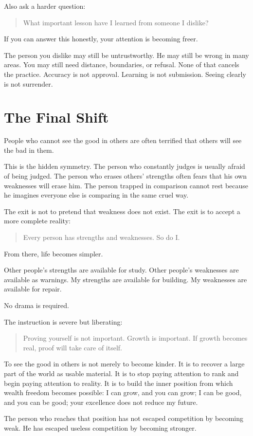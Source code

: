 Also ask a harder question:

\begin{quote}
What important lesson have I learned from someone I dislike?
\end{quote}

If you can answer this honestly, your attention is becoming freer.

The person you dislike may still be untrustworthy. He may still be wrong in many areas. You may still need distance, boundaries, or refusal. None of that cancels the practice. Accuracy is not approval. Learning is not submission. Seeing clearly is not surrender.

\section*{The Final Shift}

People who cannot see the good in others are often terrified that others will see the bad in them.

This is the hidden symmetry. The person who constantly judges is usually afraid of being judged. The person who erases others' strengths often fears that his own weaknesses will erase him. The person trapped in comparison cannot rest because he imagines everyone else is comparing in the same cruel way.

The exit is not to pretend that weakness does not exist. The exit is to accept a more complete reality:

\begin{quote}
Every person has strengths and weaknesses. So do I.
\end{quote}

From there, life becomes simpler.

Other people's strengths are available for study. Other people's weaknesses are available as warnings. My strengths are available for building. My weaknesses are available for repair.

No drama is required.

The instruction is severe but liberating:

\begin{quote}
Proving yourself is not important. Growth is important. If growth becomes real, proof will take care of itself.
\end{quote}

To see the good in others is not merely to become kinder. It is to recover a large part of the world as usable material. It is to stop paying attention to rank and begin paying attention to reality. It is to build the inner position from which wealth freedom becomes possible: I can grow, and you can grow; I can be good, and you can be good; your excellence does not reduce my future.

The person who reaches that position has not escaped competition by becoming weak. He has escaped useless competition by becoming stronger.
